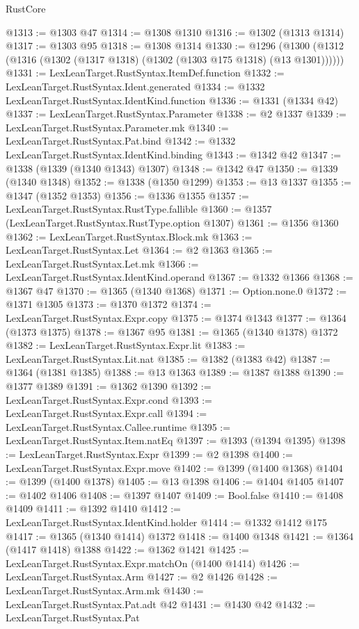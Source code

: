 \begin{lexlean}{RustCore}
\begin{coremodule}
@1313 := @1303 @47
@1314 := @1308 @1310
@1316 := @1302 (@1313 @1314)
@1317 := @1303 @95
@1318 := @1308 @1314
@1330 := @1296 (@1300 (@1312 (@1316 (@1302 (@1317 @1318) (@1302 (@1303 @175 @1318) (@13 @1301))))))
@1331 := LexLeanTarget.RustSyntax.ItemDef.function
@1332 := LexLeanTarget.RustSyntax.Ident.generated
@1334 := @1332 LexLeanTarget.RustSyntax.IdentKind.function
@1336 := @1331 (@1334 @42)
@1337 := LexLeanTarget.RustSyntax.Parameter
@1338 := @2 @1337
@1339 := LexLeanTarget.RustSyntax.Parameter.mk
@1340 := LexLeanTarget.RustSyntax.Pat.bind
@1342 := @1332 LexLeanTarget.RustSyntax.IdentKind.binding
@1343 := @1342 @42
@1347 := @1338 (@1339 (@1340 @1343) @1307)
@1348 := @1342 @47
@1350 := @1339 (@1340 @1348)
@1352 := @1338 (@1350 @1299)
@1353 := @13 @1337
@1355 := @1347 (@1352 @1353)
@1356 := @1336 @1355
@1357 := LexLeanTarget.RustSyntax.RustType.fallible
@1360 := @1357 (LexLeanTarget.RustSyntax.RustType.option @1307)
@1361 := @1356 @1360
@1362 := LexLeanTarget.RustSyntax.Block.mk
@1363 := LexLeanTarget.RustSyntax.Let
@1364 := @2 @1363
@1365 := LexLeanTarget.RustSyntax.Let.mk
@1366 := LexLeanTarget.RustSyntax.IdentKind.operand
@1367 := @1332 @1366
@1368 := @1367 @47
@1370 := @1365 (@1340 @1368)
@1371 := Option.none.{0}
@1372 := @1371 @1305
@1373 := @1370 @1372
@1374 := LexLeanTarget.RustSyntax.Expr.copy
@1375 := @1374 @1343
@1377 := @1364 (@1373 @1375)
@1378 := @1367 @95
@1381 := @1365 (@1340 @1378) @1372
@1382 := LexLeanTarget.RustSyntax.Expr.lit
@1383 := LexLeanTarget.RustSyntax.Lit.nat
@1385 := @1382 (@1383 @42)
@1387 := @1364 (@1381 @1385)
@1388 := @13 @1363
@1389 := @1387 @1388
@1390 := @1377 @1389
@1391 := @1362 @1390
@1392 := LexLeanTarget.RustSyntax.Expr.cond
@1393 := LexLeanTarget.RustSyntax.Expr.call
@1394 := LexLeanTarget.RustSyntax.Callee.runtime
@1395 := LexLeanTarget.RustSyntax.Item.natEq
@1397 := @1393 (@1394 @1395)
@1398 := LexLeanTarget.RustSyntax.Expr
@1399 := @2 @1398
@1400 := LexLeanTarget.RustSyntax.Expr.move
@1402 := @1399 (@1400 @1368)
@1404 := @1399 (@1400 @1378)
@1405 := @13 @1398
@1406 := @1404 @1405
@1407 := @1402 @1406
@1408 := @1397 @1407
@1409 := Bool.false
@1410 := @1408 @1409
@1411 := @1392 @1410
@1412 := LexLeanTarget.RustSyntax.IdentKind.holder
@1414 := @1332 @1412 @175
@1417 := @1365 (@1340 @1414) @1372
@1418 := @1400 @1348
@1421 := @1364 (@1417 @1418) @1388
@1422 := @1362 @1421
@1425 := LexLeanTarget.RustSyntax.Expr.matchOn (@1400 @1414)
@1426 := LexLeanTarget.RustSyntax.Arm
@1427 := @2 @1426
@1428 := LexLeanTarget.RustSyntax.Arm.mk
@1430 := LexLeanTarget.RustSyntax.Pat.adt @42
@1431 := @1430 @42
@1432 := LexLeanTarget.RustSyntax.Pat

\end{coremodule}
\end{lexlean}

